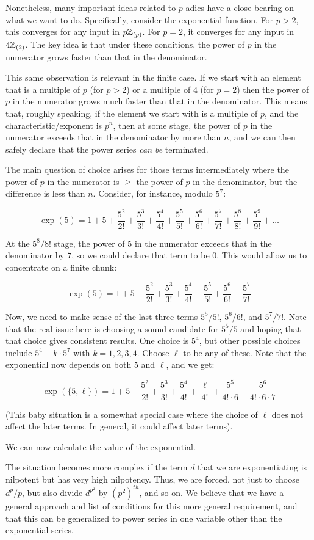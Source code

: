 \documentclass[10pt]{amsart}
\begin{document}
Nonetheless, many important ideas related to $p$-adics have a close
bearing on what we want to do. Specifically, consider the exponential
function. For $p > 2$, this converges for any input in
$p\mathbb{Z}_{(p)}$. For $p = 2$, it converges for any input in
$4\mathbb{Z}_{(2)}$. The key idea is that under these conditions, the power of
$p$ in the numerator grows faster than that in the denominator.

This same observation is relevant in the finite case. If we start with
an element that is a multiple of $p$ (for $p > 2$) or a multiple of
$4$ (for $p = 2$) then the power of $p$ in the numerator grows much
faster than that in the denominator. This means that, roughly
speaking, if the element we start with is a multiple of $p$, and the
characteristic/exponent is $p^n$, then at some stage, the power of $p$
in the numerator exceeds that in the denominator by more than $n$, and
we can then safely declare that the power series {\em can be} terminated. 

The main question of choice arises for those terms intermediately
where the power of $p$ in the numerator is $\ge$ the power of $p$ in
the denominator, but the difference is less than $n$. Consider, for
instance, modulo $5^7$:

$$\exp(5) = 1 + 5 + \frac{5^2}{2!} + \frac{5^3}{3!} + \frac{5^4}{4!} + \frac{5^5}{5!} + \frac{5^6}{6!} + \frac{5^7}{7!} + \frac{5^8}{8!} + \frac{5^9}{9!} + \dots$$

At the $5^8/8!$ stage, the power of $5$ in the numerator exceeds that
in the denominator by $7$, so we could declare that term to be
$0$. This would allow us to concentrate on a finite chunk:

$$\exp(5) = 1 + 5 + \frac{5^2}{2!} + \frac{5^3}{3!} + \frac{5^4}{4!} + \frac{5^5}{5!} + \frac{5^6}{6!} + \frac{5^7}{7!}$$

Now, we need to make sense of the last three terms $5^5/5!$, $5^6/6!$,
and $5^7/7!$. Note that the real issue here is choosing a sound
candidate for $5^5/5$ and hoping that that choice gives consistent
results. One choice is $5^4$, but other possible choices include $5^4
+ k \cdot 5^7$ with $k = 1,2,3,4$. Choose $\ell$ to be any of
these. Note that the exponential now depends on both $5$ and $\ell$, and we get:

$$\exp(\{5, \ell \}) = 1 + 5 + \frac{5^2}{2!} + \frac{5^3}{3!} + \frac{5^4}{4!}  + \frac{\ell}{4!} + \frac{5^5}{4! \cdot 6} + \frac{5^6}{4! \cdot 6 \cdot 7}$$

(This baby situation is a somewhat special case where the choice of
$\ell$ does not affect the later terms. In general, it could affect
later terms).

We can now calculate the value of the exponential.

The situation becomes more complex if the term $d$ that we are
exponentiating is nilpotent but has very high nilpotency. Thus, we are
forced, not just to choose $d^p/p$, but also divide $d^{p^2}$ by
$(p^2)^{th}$, and so on. We believe that we have a general approach
and list of conditions for this more general requirement, and that
this can be generalized to power series in one variable other than the
exponential series.
\end{document}
